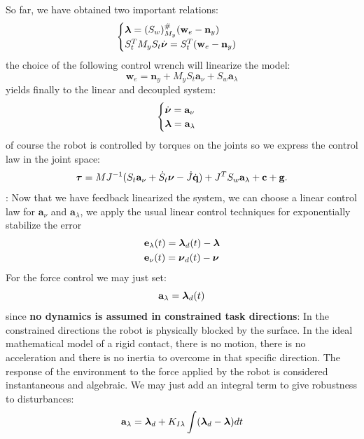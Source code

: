 \documentclass[10pt, a4paper]{report}
\begin{document}
So far, we have obtained two important relations:\begin{equation}\begin{cases}
    {\boldsymbol{\lambda}}=(S_w)_{M_y}^\# (\mathbf w_e-\mathbf n_y)\\
    S_t^TM_yS_t\dot{{\boldsymbol{\nu}}}=S_t^T(\mathbf w_e-\mathbf n_y)
\end{cases}\end{equation}
the choice of the following control wrench will linearize the model:\begin{equation}
    \mathbf w_e=\mathbf n_y+M_yS_t\mathbf a_\nu+S_w\mathbf a_\lambda 
\end{equation}
yields finally to the linear and decoupled system:\begin{equation}
    \begin{cases}
       \dot{{\boldsymbol{\nu}}}=\mathbf a_\nu \\
         {\boldsymbol{\lambda}}=\mathbf a_\lambda 
    \end{cases}
\end{equation}
of course the robot is controlled by torques on the joints so we express the control law in the joint space:\begin{equation}\label{hybrid_law}
    {\boldsymbol{\tau}}=MJ^{-1}(S_t\mathbf a_\nu+\dot S_t{\boldsymbol{\nu}}-\dot J{\dot{\mathbf q}})+J^TS_w\mathbf a_\lambda+\mathbf c+\mathbf g.
\end{equation}
\noindent\textbf{{}}: Now that we have feedback linearized the system, we can choose a linear control law for $\mathbf a_\nu$ and $\mathbf a_\lambda$, we apply the usual linear control techniques for exponentially stabilize the error\begin{align}
&\mathbf e_\lambda(t)={\boldsymbol{\lambda}}_d(t)-{\boldsymbol{\lambda}}\\
&\mathbf e_\nu(t)={\boldsymbol{\nu}}_d(t)-{\boldsymbol{\nu}}\\
\end{align} For the force control we may just set:\begin{equation}
    \mathbf a_\lambda={\boldsymbol{\lambda}}_d(t)
\end{equation}
since \textbf{no dynamics
is assumed in constrained task directions}: In the constrained directions the robot is physically blocked by the surface. In the ideal mathematical model of a rigid contact, there is no motion, there is no acceleration and there is no inertia to overcome in that specific direction. The response of the environment to the force applied by the robot is considered instantaneous and algebraic. We may just add an integral term to give robustness to disturbances:
\begin{equation}
    \mathbf a_\lambda={\boldsymbol{\lambda}}_d+K_{I\lambda}\int({\boldsymbol{\lambda}}_d-{\boldsymbol{\lambda}})dt
\end{equation}
\end{document}
